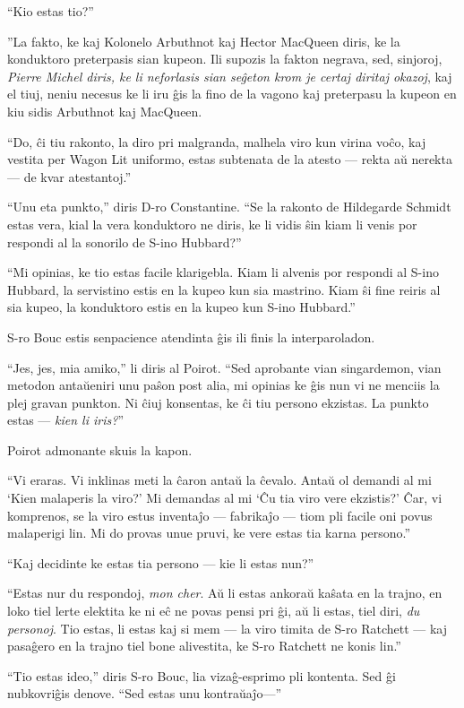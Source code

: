 ``Kio estas tio?''

''La fakto, ke kaj Kolonelo Arbuthnot kaj Hector MacQueen diris, ke la konduktoro preterpasis sian kupeon. Ili supozis la fakton negrava, sed, sinjoroj, \emph{Pierre Michel diris, ke li neforlasis sian seĝeton krom je certaj diritaj okazoj}, kaj el tiuj, neniu necesus ke li iru ĝis la fino de la vagono kaj preterpasu la kupeon en kiu sidis Arbuthnot kaj MacQueen.

``Do, ĉi tiu rakonto, la diro pri malgranda, malhela viro kun virina voĉo, kaj vestita per Wagon Lit uniformo, estas subtenata de la atesto --- rekta aŭ nerekta --- de kvar atestantoj.''

``Unu eta punkto,'' diris D-ro Constantine. ``Se la rakonto de Hildegarde Schmidt estas vera, kial la vera konduktoro ne diris, ke li vidis ŝin kiam li venis por respondi al la sonorilo de S-ino Hubbard?''

``Mi opinias, ke tio estas facile klarigebla. Kiam li alvenis por respondi al S-ino Hubbard, la servistino estis en la kupeo kun sia mastrino. Kiam ŝi fine reiris al sia kupeo, la konduktoro estis en la kupeo kun S-ino Hubbard.''

S-ro Bouc estis senpacience atendinta ĝis ili finis la interparoladon.

``Jes, jes, mia amiko,'' li diris al Poirot. ``Sed aprobante vian singardemon, vian metodon antaŭeniri unu paŝon post alia, mi opinias ke ĝis nun vi ne menciis la plej gravan punkton. Ni ĉiuj konsentas, ke ĉi tiu persono ekzistas. La punkto estas --- \emph{kien li iris?}''

Poirot admonante skuis la kapon.

``Vi eraras. Vi inklinas meti la ĉaron antaŭ la ĉevalo. Antaŭ ol demandi al mi `Kien malaperis la viro?' Mi demandas al mi `Ĉu tia viro vere ekzistis?' Ĉar, vi komprenos, se la viro estus inventaĵo --- fabrikaĵo --- tiom pli facile oni povus malaperigi lin. Mi do provas unue pruvi, ke vere estas tia karna persono.''

``Kaj decidinte ke estas tia persono --- kie li estas nun?''

``Estas nur du respondoj, \emph{mon cher}. Aŭ li estas ankoraŭ kaŝata en la trajno, en loko tiel lerte elektita ke ni eĉ ne povas pensi pri ĝi, aŭ li estas, tiel diri, \emph{du personoj}. Tio estas, li estas kaj si mem --- la viro timita de S-ro Ratchett --- kaj pasaĝero en la trajno tiel bone alivestita, ke S-ro Ratchett ne konis lin.''

``Tio estas ideo,'' diris S-ro Bouc, lia vizaĝ-esprimo pli kontenta. Sed ĝi nubkovriĝis denove. ``Sed estas unu kontraŭaĵo---''

